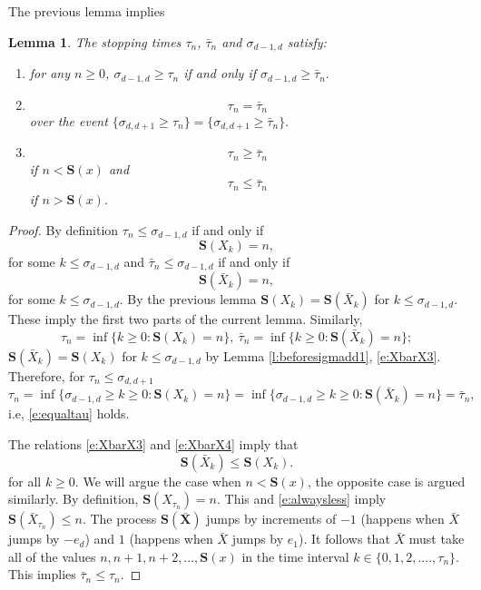 \documentclass[11pt,a4paper]{article}
\newtheorem{lemma}{Lemma}
\begin{document}
The previous lemma implies
\begin{lemma}\label{l:comparetau}
The stopping times $\tau_n$, $\bar\tau_n$ and $\sigma_{d-1,d}$ satisfy:
\begin{enumerate}
\item
for any $n \ge 0$, $\sigma_{d-1,d} \ge \tau_n $ if and only if
$\sigma_{d-1,d} \ge \bar{\tau}_n.$
\item
\begin{equation}\label{e:equaltau}
\tau_n = \bar{\tau}_n 
\end{equation}
over the event $\{ \sigma_{d,d+1} \ge \tau_n\}=\{ \sigma_{d,d+1} \ge \bar\tau_n\}.$
\item  \begin{equation}\label{e:comparetaun1}
\tau_n \ge \bar{\tau}_n 
\end{equation}
if $n < {\bm S}(x)$
and\begin{equation}\label{e:comparetaun2}
\tau_n \le \bar\tau_n 
\end{equation}
if $ n > {\bm S}(x).$
\end{enumerate}
\end{lemma}
\begin{proof}
By definition
$\tau_n \le \sigma_{d-1,d}$ if and only if
\[
{\bm S}(X_k) =n,
\]
for some $k \le \sigma_{d-1,d}$ and
$\bar\tau_n \le \sigma_{d-1,d}$ if and only if
\[
{\bm S}(\bar{X}_k) =n,
\]
for some $k \le \sigma_{d-1,d}$.
By the previous lemma ${\bm S}(X_k) = {\bm S}({\bar X}_k)$ for 
$k \le \sigma_{d-1,d}.$ These imply the first two parts of the current lemma.
Similarly,
\[
\tau_n = \inf \{k \ge 0: {\bm S}(X_k) = n \},~
\bar\tau_n = \inf \{k \ge 0: {\bm S}(\bar{X}_k) = n \};
\]
${\bm S}(\bar{X}_k) = {\bm S}(X_k)$ for $k \le \sigma_{d-1,d}$
by Lemma \ref{l:beforesigmadd1}, \eqref{e:XbarX3}. Therefore,
for $\tau_n \le \sigma_{d,d+1}$
\[
\tau_n = \inf \{\sigma_{d-1,d} \ge k \ge 0: {\bm S}(X_k) = n \}
 = \inf \{\sigma_{d-1,d} \ge k \ge 0: {\bm S}(\bar{X}_k) = n \} = \bar{\tau}_n,
\]
i.e, \eqref{e:equaltau} holds.

The relations \eqref{e:XbarX3} and \eqref{e:XbarX4} imply that
\begin{equation}\label{e:alwaysless}
{\bm S}(\bar{X}_k) \le {\bm S}(X_k).
\end{equation}
for all $k \ge 0.$
We will argue the case when $n < {\bm S}(x)$, the opposite case is argued
similarly. By definition, ${\bm S}(X_{\tau_n}) = n.$ This and \eqref{e:alwaysless} imply ${\bm S}(\bar{X}_{\tau_n}) \le n.$ The process ${\bm S}(\bm \bar X)$ 
jumps by increments of $-1$ (happens when $\bar X$ jumps by $-e_d$)
 and $1$ (happens when $\bar X$ jumps by $e_1$). It follows that $\bar{X}$
must take all of the values $n,n+1,n+2,...,{\bm S}(x)$ in the time interval
$k \in \{0,1,2,...., \tau_n\}.$ This implies $\bar \tau_n \le \tau_n.$

\end{proof}
\end{document}
